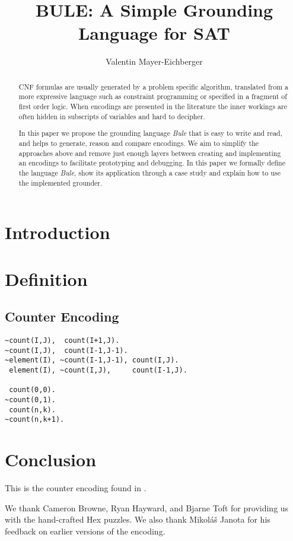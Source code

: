 \documentclass{ecai}
\begin{document}
\title{BULE: A Simple Grounding Language for SAT}
\author{Valentin Mayer-Eichberger}
\maketitle

\begin{abstract}
CNF formulas are usually generated by a problem specific algorithm, translated
    from a more expressive language such as constraint programming or specified
    in a fragment of first order logic. When encodings are  presented in the
    literature the inner workings are often hidden in subscripts of variables
    and hard to decipher.

In this paper we propose the grounding language \emph{Bule} that is easy to
    write and read, and helps to generate, reason and compare encodings. We aim
    to simplify the approaches above and remove just enough layers between
    creating and implementing an encodings to facilitate prototyping and
    debugging. In this paper we formally define the language \emph{Bule}, show
    its application through a case study and explain how to use the implemented
    grounder. 
\end{abstract}

\section{Introduction}
\section{Definition}
\subsection{Counter Encoding}


\begin{lstlisting}
~count(I,J),  count(I+1,J).
~count(I,J),  count(I-1,J-1).
~element(I), ~count(I-1,J-1), count(I,J).
 element(I), ~count(I,J),     count(I-1,J).

 count(0,0).
~count(0,1).
 count(n,k).
~count(n,k+1).
\end{lstlisting}

\section{Conclusion}

This is the counter encoding found in \cite{sinz2005}.

We thank Cameron Browne, Ryan Hayward, and Bjarne Toft for providing us with
the hand-crafted Hex puzzles. We also thank Mikoláš Janota for his feedback on
earlier versions of the encoding.



\end{document}
